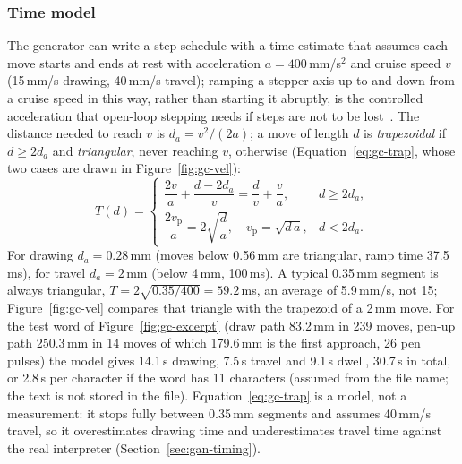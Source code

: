 \subsubsection{Time model}

The generator can write a step schedule with a time estimate that assumes each move starts and ends at rest with acceleration $a=400$\,mm/s$^2$ and cruise speed $v$ (15\,mm/s drawing, 40\,mm/s travel); ramping a stepper axis up to and down from a cruise speed in this way, rather than starting it abruptly, is the controlled acceleration that open-loop stepping needs if steps are not to be lost~\cite{acarnley2002}.
The distance needed to reach $v$ is $d_a=v^2/(2a)$; a move of length $d$ is \emph{trapezoidal} if $d\ge2d_a$ and \emph{triangular}, never reaching $v$, otherwise (Equation~\ref{eq:gc-trap}, whose two cases are drawn in Figure~\ref{fig:gc-vel}):
\begin{equation}
T(d)=\begin{cases}\dfrac{2v}{a}+\dfrac{d-2d_a}{v}=\dfrac{d}{v}+\dfrac{v}{a},&d\ge2d_a,\\[2mm]\dfrac{2v_{\mathrm p}}{a}=2\sqrt{\dfrac{d}{a}},\quad v_{\mathrm p}=\sqrt{d\,a},&d<2d_a.\end{cases}
\label{eq:gc-trap}
\end{equation}
For drawing $d_a=0.28$\,mm (moves below 0.56\,mm are triangular, ramp time 37.5\,ms), for travel $d_a=2$\,mm (below 4\,mm, 100\,ms).
A typical 0.35\,mm segment is always triangular, $T=2\sqrt{0.35/400}=59.2$\,ms, an average of 5.9\,mm/s, not 15; Figure~\ref{fig:gc-vel} compares that triangle with the trapezoid of a 2\,mm move.
For the test word of Figure~\ref{fig:gc-excerpt} (draw path 83.2\,mm in 239 moves, pen-up path 250.3\,mm in 14 moves of which 179.6\,mm is the first approach, 26 pen pulses) the model gives 14.1\,s drawing, 7.5\,s travel and 9.1\,s dwell, 30.7\,s in total, or 2.8\,s per character if the word has 11 characters (assumed from the file name; the text is not stored in the file).
Equation~\ref{eq:gc-trap} is a model, not a measurement: it stops fully between 0.35\,mm segments and assumes 40\,mm/s travel, so it overestimates drawing time and underestimates travel time against the real interpreter (Section~\ref{sec:gan-timing}).

